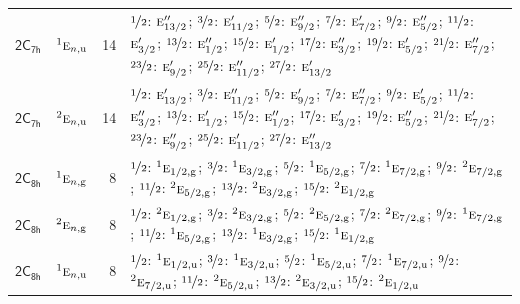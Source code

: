 \documentclass[10pt,a4paper]{article}
\numberwithin{equation}{section}
\newcommand{\grp}[1]{\mathsf{#1}}
\newcommand{\irr}[1]{\text{\normalfont\scshape #1}}
\newcommand{\conjpair}[1]{{}^{#1}}
\newcommand{\ptag}[1]{\mathrm{#1}}
\newlength{\fillwidth}\newlength{\cellwidth}\newlength{\colwidth}
\begin{document}
{\begin{longtable}{@{}llr>{\RaggedRight\arraybackslash}p{\fillwidth}@{}}
\href{2C7h.pdf}{$\grp{2C_{7h}}$} & $\conjpair{1}\irr{e}_{n,\ptag{u}}$ & 14 & $\nicefrac{1}{2}$: $\irr{e}_{13/2}''$; $\nicefrac{3}{2}$: $\irr{e}_{11/2}'$; $\nicefrac{5}{2}$: $\irr{e}_{9/2}''$; $\nicefrac{7}{2}$: $\irr{e}_{7/2}'$; $\nicefrac{9}{2}$: $\irr{e}_{5/2}''$; $\nicefrac{11}{2}$: $\irr{e}_{3/2}'$; $\nicefrac{13}{2}$: $\irr{e}_{1/2}''$; $\nicefrac{15}{2}$: $\irr{e}_{1/2}'$; $\nicefrac{17}{2}$: $\irr{e}_{3/2}''$; $\nicefrac{19}{2}$: $\irr{e}_{5/2}'$; $\nicefrac{21}{2}$: $\irr{e}_{7/2}''$; $\nicefrac{23}{2}$: $\irr{e}_{9/2}'$; $\nicefrac{25}{2}$: $\irr{e}_{11/2}''$; $\nicefrac{27}{2}$: $\irr{e}_{13/2}'$\\
\href{2C7h.pdf}{$\grp{2C_{7h}}$} & $\conjpair{2}\irr{e}_{n,\ptag{u}}$ & 14 & $\nicefrac{1}{2}$: $\irr{e}_{13/2}'$; $\nicefrac{3}{2}$: $\irr{e}_{11/2}''$; $\nicefrac{5}{2}$: $\irr{e}_{9/2}'$; $\nicefrac{7}{2}$: $\irr{e}_{7/2}''$; $\nicefrac{9}{2}$: $\irr{e}_{5/2}'$; $\nicefrac{11}{2}$: $\irr{e}_{3/2}''$; $\nicefrac{13}{2}$: $\irr{e}_{1/2}'$; $\nicefrac{15}{2}$: $\irr{e}_{1/2}''$; $\nicefrac{17}{2}$: $\irr{e}_{3/2}'$; $\nicefrac{19}{2}$: $\irr{e}_{5/2}''$; $\nicefrac{21}{2}$: $\irr{e}_{7/2}'$; $\nicefrac{23}{2}$: $\irr{e}_{9/2}''$; $\nicefrac{25}{2}$: $\irr{e}_{11/2}'$; $\nicefrac{27}{2}$: $\irr{e}_{13/2}''$\\
\href{2C8h.pdf}{$\grp{2C_{8h}}$} & $\conjpair{1}\irr{e}_{n,\ptag{g}}$ & 8 & $\nicefrac{1}{2}$: $\conjpair{1}\irr{e}_{1/2,\ptag{g}}$; $\nicefrac{3}{2}$: $\conjpair{1}\irr{e}_{3/2,\ptag{g}}$; $\nicefrac{5}{2}$: $\conjpair{1}\irr{e}_{5/2,\ptag{g}}$; $\nicefrac{7}{2}$: $\conjpair{1}\irr{e}_{7/2,\ptag{g}}$; $\nicefrac{9}{2}$: $\conjpair{2}\irr{e}_{7/2,\ptag{g}}$; $\nicefrac{11}{2}$: $\conjpair{2}\irr{e}_{5/2,\ptag{g}}$; $\nicefrac{13}{2}$: $\conjpair{2}\irr{e}_{3/2,\ptag{g}}$; $\nicefrac{15}{2}$: $\conjpair{2}\irr{e}_{1/2,\ptag{g}}$\\
\href{2C8h.pdf}{$\grp{2C_{8h}}$} & $\conjpair{2}\irr{e}_{n,\ptag{g}}$ & 8 & $\nicefrac{1}{2}$: $\conjpair{2}\irr{e}_{1/2,\ptag{g}}$; $\nicefrac{3}{2}$: $\conjpair{2}\irr{e}_{3/2,\ptag{g}}$; $\nicefrac{5}{2}$: $\conjpair{2}\irr{e}_{5/2,\ptag{g}}$; $\nicefrac{7}{2}$: $\conjpair{2}\irr{e}_{7/2,\ptag{g}}$; $\nicefrac{9}{2}$: $\conjpair{1}\irr{e}_{7/2,\ptag{g}}$; $\nicefrac{11}{2}$: $\conjpair{1}\irr{e}_{5/2,\ptag{g}}$; $\nicefrac{13}{2}$: $\conjpair{1}\irr{e}_{3/2,\ptag{g}}$; $\nicefrac{15}{2}$: $\conjpair{1}\irr{e}_{1/2,\ptag{g}}$\\
\href{2C8h.pdf}{$\grp{2C_{8h}}$} & $\conjpair{1}\irr{e}_{n,\ptag{u}}$ & 8 & $\nicefrac{1}{2}$: $\conjpair{1}\irr{e}_{1/2,\ptag{u}}$; $\nicefrac{3}{2}$: $\conjpair{1}\irr{e}_{3/2,\ptag{u}}$; $\nicefrac{5}{2}$: $\conjpair{1}\irr{e}_{5/2,\ptag{u}}$; $\nicefrac{7}{2}$: $\conjpair{1}\irr{e}_{7/2,\ptag{u}}$; $\nicefrac{9}{2}$: $\conjpair{2}\irr{e}_{7/2,\ptag{u}}$; $\nicefrac{11}{2}$: $\conjpair{2}\irr{e}_{5/2,\ptag{u}}$; $\nicefrac{13}{2}$: $\conjpair{2}\irr{e}_{3/2,\ptag{u}}$; $\nicefrac{15}{2}$: $\conjpair{2}\irr{e}_{1/2,\ptag{u}}$\\

\end{longtable}}
\end{document}
